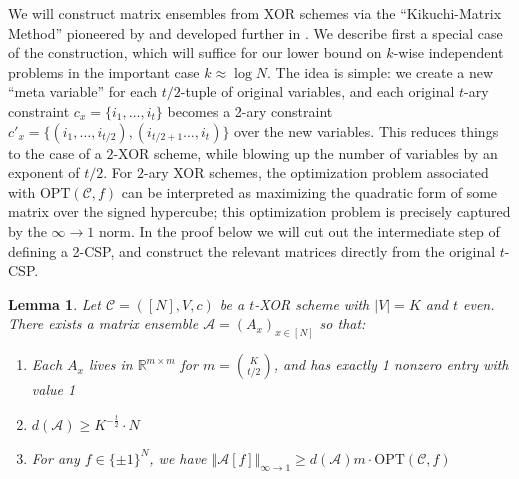 \documentclass[11pt]{article}
\newtheorem{lemma}{Lemma}
\newcommand{\norm}[1]{\Vert #1 \Vert}
\newcommand{\Opt}{\mathrm{OPT}}
\newcommand{\N}{[N]}
\begin{document}
We will construct matrix ensembles from XOR schemes via the ``Kikuchi-Matrix Method'' pioneered by \cite{wein2019kikuchi} and developed further in \cite{smoothed}. We describe first a special case of the construction, which will suffice for our lower bound on $k$-wise independent problems in the important case $k \approx \log N$. The idea is simple: we create a new ``meta variable'' for each $t/2$-tuple of original variables, and each original $t$-ary constraint $c_x = \{i_1,\ldots,i_t\}$ becomes a 2-ary constraint $c'_x = \{(i_1,\ldots, i_{t/2}),(i_{t/2+1}\ldots,i_t)\}$ over the new variables. This reduces things to the case of a $2$-XOR scheme, while blowing up the number of variables by an exponent of $t/2$. For $2$-ary XOR schemes, the optimization problem associated with $\Opt(\mathcal{C},f)$ can be interpreted as maximizing the quadratic form of some matrix over the signed hypercube; this optimization problem is precisely captured by the $\infty\to1$ norm. In the proof below we will cut out the intermediate step of defining a 2-CSP, and construct the relevant matrices directly from the original $t$-CSP.
\begin{lemma}\label{lem:kikuchi-warmup}
Let $\mathcal{C} = (\N,V,c)$ be a $t$-XOR scheme with $|V|=K$ and $t$ even. There exists a matrix ensemble $\mathcal{A} = (A_x )_{x \in \N}$ so that:
\begin{enumerate}
    \item Each $A_x$ lives in $\mathbb{R}^{m \times m}$ for $m = \binom{K}{t/2}$, and has exactly 1 nonzero entry with value 1
    \item $d(\mathcal{A}) \geq  K^{-\frac{t}{2}} \cdot N$
    \item For any $f \in \{\pm 1\}^N$, we have $\norm{\mathcal{A}[f]}_{\infty \to 1} \geq d(\mathcal{A}) m\cdot \Opt(\mathcal{C},f)$
\end{enumerate}
\end{lemma}
\end{document}
